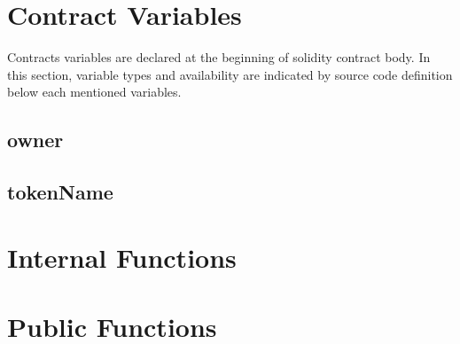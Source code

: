 \documentclass[letterpaper,10pt,english]{sphinxmanual}
\begin{document}
\section{Contract Variables}
\label{\detokenize{index:contract-variables}}
Contracts variables are declared at the beginning of solidity contract body.
In this section, variable types and availability are indicated by source code definition
below each mentioned variables.


\subsection{owner}
\label{\detokenize{index:owner}}
%
\begin{sphinxVerbatim}[commandchars=\\\{\}]
 
\end{sphinxVerbatim}


\subsection{tokenName}
\label{\detokenize{index:tokenname}}

\section{Internal Functions}
\label{\detokenize{index:internal-functions}}

\section{Public Functions}
\label{\detokenize{index:public-functions}}


\renewcommand{\indexname}{Index}
\printindex
\end{document}

